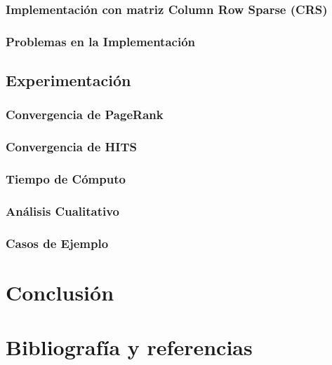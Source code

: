 \subsubsection{Implementación con matriz Column Row Sparse (CRS)}

\subsubsection{Problemas en la Implementación}


\subsection{Experimentación}
\subsubsection{Convergencia de PageRank}

\subsubsection{Convergencia de HITS}

\subsubsection{Tiempo de Cómputo}	

\subsubsection{Análisis Cualitativo}

\subsubsection{Casos de Ejemplo}
	
	
\section{Conclusión}


\section{Bibliografía y referencias} %

